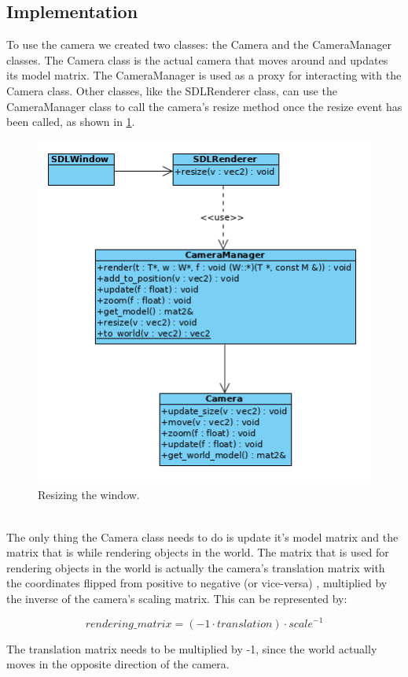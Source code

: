 \subsection{Implementation}
To use the camera we created two classes: the Camera and the CameraManager 
classes. The Camera class is the actual camera that moves around and updates 
its model matrix. The CameraManager is used as a proxy for interacting with 
the Camera class. Other classes, like the SDLRenderer class, can use the 
CameraManager class to call the camera's resize method once the resize event 
has been called, as shown in \cref{fig:renderer-resize}.

\begin{figure}[H]
    \centering
    \includegraphics[scale=0.75]{res/renderer-resize.png}
    \caption{Resizing the window.}\label{fig:renderer-resize}
\end{figure}
~\\
The only thing the Camera class needs to do is update it's model matrix and 
the matrix that is while rendering objects in the world. The matrix that is 
used for rendering objects in the world is actually the camera's translation 
matrix with the coordinates flipped from positive to negative (or vice-versa)
, multiplied by the inverse of the camera's scaling matrix.
This can be represented by:

$$ rendering\_matrix = (-1 \cdot translation) \cdot scale^{-1} $$

The translation matrix needs to be multiplied by -1, since the world actually 
moves in the opposite direction of the camera.

